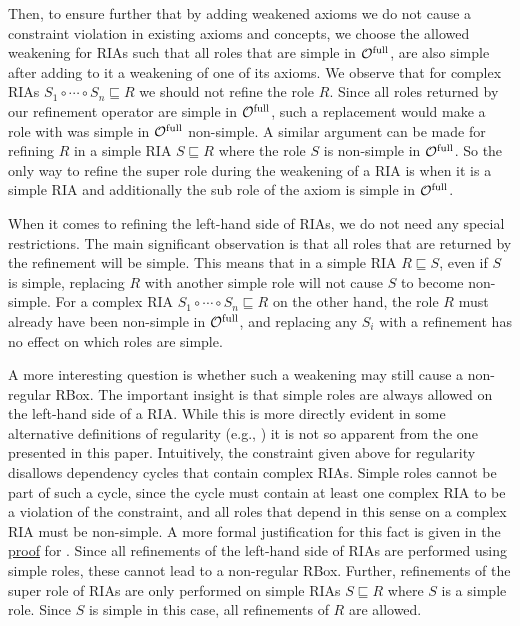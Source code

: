 \documentclass[
]{ceurart}
\begin{document}
Then, to ensure further that by adding weakened axioms we do not cause a constraint violation in existing axioms and concepts, we choose the allowed weakening for RIAs such that all roles that are simple in ${\mathcal{O}^\textnormal{full}}$, are also simple after adding to it a weakening of one of its axioms. We observe that for complex RIAs $S_1 \circ \cdots \circ S_n \sqsubseteq R$ we should not refine the role $R$. Since all roles returned by our refinement operator are simple in ${\mathcal{O}^\textnormal{full}}$, such a replacement would make a role with was simple in ${\mathcal{O}^\textnormal{full}}$ non-simple. A similar argument can be made for refining $R$ in a simple RIA $S \sqsubseteq R$ where the role $S$ is non-simple in ${\mathcal{O}^\textnormal{full}}$. So the only way to refine the super role during the weakening of a RIA is when it is a simple RIA and additionally the sub role of the axiom is simple in ${\mathcal{O}^\textnormal{full}}$.

When it comes to refining the left-hand side of RIAs, we do not need any special restrictions. The main significant observation is that all roles that are returned by the refinement will be simple. This means that in a simple RIA $R \sqsubseteq S$, even if $S$ is simple, replacing $R$ with another simple role will not cause $S$ to become non-simple. For a complex RIA $S_1 \circ \cdots \circ S_n \sqsubseteq R$ on the other hand, the role $R$ must already have been non-simple in ${\mathcal{O}^\textnormal{full}}$, and replacing any $S_i$ with a refinement has no effect on which roles are simple.

A more interesting question is whether such a weakening may still cause a non-regular RBox. The important insight is that simple roles are always allowed on the left-hand side of a RIA. While this is more directly evident in some alternative definitions of regularity (e.g., \cite{rudolph2011foundations}) it is not so apparent from the one presented in this paper. Intuitively, the constraint given above for regularity disallows dependency cycles that contain complex RIAs. Simple roles cannot be part of such a cycle, since the cycle must contain at least one complex RIA to be a violation of the constraint, and all roles that depend in this sense on a complex RIA must be non-simple. A more formal justification for this fact is given in the \hyperref[proof:regularity]{proof} for .
Since all refinements of the left-hand side of RIAs are performed using simple roles, these cannot lead to a non-regular RBox. Further, refinements of the super role of RIAs are only performed on simple RIAs $S \sqsubseteq R$ where $S$ is a simple role. Since $S$ is simple in this case, all refinements of $R$ are allowed.
\end{document}
